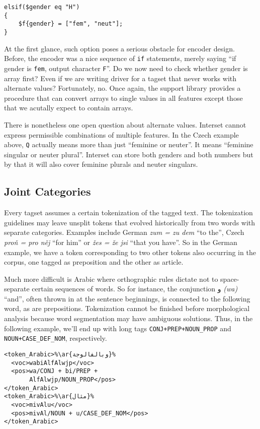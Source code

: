 \documentclass[11pt]{article}
\newcommand{\ar}[1]{{\arfont #1}}
\newcommand{\translit}[1]{{\translitfont \textit{(#1)}}}
\begin{document}
\begin{lstlisting}
elsif($gender eq "H") 
{ 
    $f{gender} = ["fem", "neut"]; 
}
\end{lstlisting}

At the first glance, such option poses a serious obstacle for encoder design. Before, the encoder was a nice sequence of \texttt{if} statements, merely saying ``if gender is \texttt{fem}, output character \texttt{F}''. Do we now need to check whether gender is array first? Even if we are writing driver for a tagset that never works with alternate values? Fortunately, no. Once again, the support library provides a procedure that can convert arrays to single values in all features except those that we acutally expect to contain arrays.

There is nonetheless one open question about alternate values. Interset cannot express permissible combinations of multiple features. In the Czech example above, \texttt{Q} actually means more than just ``feminine or neuter''. It means ``feminine singular or neuter plural''. Interset can store both genders and both numbers but by that it will also cover feminine plurals and neuter singulars.

\subsection{Joint Categories}
\label{sec:joint}

Every tagset assumes a certain tokenization of the tagged text. The tokenization guidelines may leave unsplit tokens that evolved historically from two words with separate categories. Examples include German \textit{zum = zu dem} ``to the'', Czech \textit{proň = pro něj} ``for him'' or \textit{žes = že jsi} ``that you have''. So in the German example, we have a token corresponding to two other tokens also occurring in the corpus, one tagged as preposition and the other as article.

Much more difficult is Arabic where orthographic rules dictate not to space-separate certain sequences of words. So for instance, the conjunction \ar{و} \translit{wa} ``and'', often thrown in at the sentence beginnings, is connected to the following word, as are prepositions. Tokenization cannot be finished before morphological analysis because word segmentation may have ambiguous solutions. Thus, in the following example, we'll end up with long tags \texttt{CONJ+PREP+NOUN\_PROP} and \texttt{NOUN+CASE\_DEF\_NOM}, respectively.

\lstset{language=XML}
\begin{lstlisting}[escapechar=\%]
<token_Arabic>%\ar{وبالفالوجة}%
  <voc>wabiAlfAlwjp</voc>
  <pos>wa/CONJ + bi/PREP +
       AlfAlwjp/NOUN_PROP</pos>
</token_Arabic>
<token_Arabic>%\ar{مثال}%
  <voc>mivAlu</voc>
  <pos>mivAl/NOUN + u/CASE_DEF_NOM</pos>
</token_Arabic>
\end{lstlisting}
\end{document}
